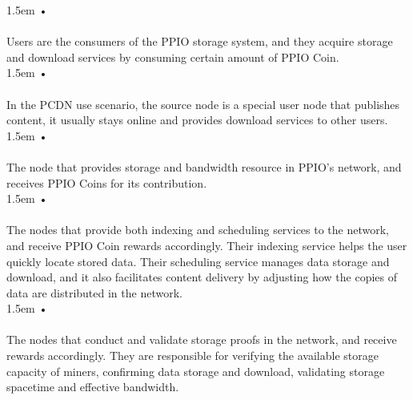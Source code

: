 \documentclass[10pt,a4paper]{article}
\begin{document}
\hangindent 1.5em
\noindent   
• 
   \vspace{-0.8em}
\\ \\Users are the consumers of the PPIO storage system, and they acquire storage and download services by consuming certain amount of PPIO Coin.
   \vspace{-0.8em}
\\

\hangindent 1.5em
\noindent   
•
   \vspace{-0.8em}
\\ \\In the PCDN use scenario, the source node is a special user node that publishes content, it usually stays online and provides download services to other users.
   \vspace{-0.8em}
\\

\hangindent 1.5em
\noindent   
•
   \vspace{-0.8em}
\\ \\The node that provides storage and bandwidth resource in PPIO’s network, and receives PPIO Coins for its contribution.
   \vspace{-0.6em}
\\

\hangindent 1.5em
\noindent   
•
   \vspace{-0.8em}
\\ \\The nodes that provide both indexing and scheduling services to the network, and receive PPIO Coin rewards accordingly. Their indexing service helps the user quickly locate stored data. Their scheduling service manages data storage and download, and it also facilitates content delivery by adjusting how the copies of data are distributed in the network.
   \vspace{-0.8em}
\\

\hangindent 1.5em
\noindent   
•
   \vspace{-0.8em}
\\ \\The nodes that conduct and validate storage proofs in the network, and receive rewards accordingly. They are responsible for verifying the available storage capacity of miners, confirming data storage and download, validating storage spacetime and effective bandwidth.
   \vspace{-0.6em}
\\
\end{document}
